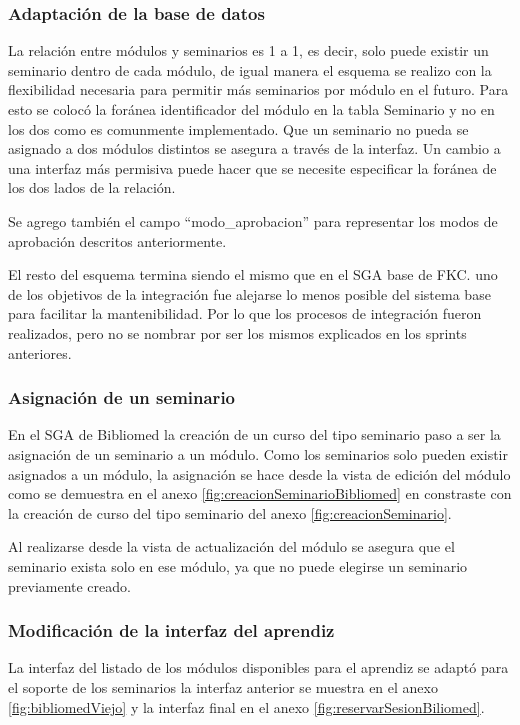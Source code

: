 \subsubsection{Adaptación de la base de datos}

La relación entre módulos y seminarios es 1 a 1, es decir, solo puede existir un seminario dentro de cada módulo, de igual manera el esquema se realizo con la flexibilidad necesaria para permitir más seminarios por módulo en el futuro. Para esto se colocó la foránea identificador del módulo en la tabla Seminario y no en los dos como es comunmente implementado. Que un seminario no pueda se asignado a dos módulos distintos se asegura a través de la interfaz. Un cambio a una interfaz más permisiva puede hacer que se necesite especificar la foránea de los dos lados de la relación. 

Se agrego también el campo ``modo\_aprobacion'' para representar los modos de aprobación descritos anteriormente.

El resto del esquema termina siendo el mismo que en el SGA base de FKC. uno de los objetivos de la integración fue alejarse lo menos posible del sistema base para facilitar la mantenibilidad. Por lo que los procesos de integración fueron realizados, pero no se nombrar por ser los mismos explicados en los sprints anteriores.

\subsubsection{Asignación de un seminario}

En el SGA de Bibliomed la creación de un curso del tipo seminario paso a ser la asignación de un seminario a un módulo. Como los seminarios solo pueden existir asignados a un módulo, la asignación se hace desde la vista de edición del módulo como se demuestra en el anexo \ref{fig:creacionSeminarioBibliomed} en constraste con la creación de curso del tipo seminario del anexo \ref{fig:creacionSeminario}.

Al realizarse desde la vista de actualización del módulo se asegura que el seminario exista solo en ese módulo, ya que no puede elegirse un seminario previamente creado.

\subsubsection{Modificación de la interfaz del aprendiz}

La interfaz del listado de los módulos disponibles para el aprendiz se adaptó para el soporte de los seminarios la interfaz anterior se muestra en el anexo \ref{fig:bibliomedViejo} y la interfaz final en el anexo \ref{fig:reservarSesionBiliomed}.

